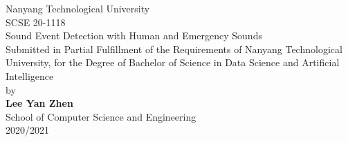 \begin{titlepage}
\centering
\Large{Nanyang Technological University}\\[1.5in]

\centering
\Large{SCSE 20-1118}\\[0.1in]
\Large{Sound Event Detection with Human and Emergency Sounds}\\[1.5in]

\Large{Submitted in Partial Fulfillment of the 
Requirements of Nanyang Technological University, 
for the Degree of Bachelor of Science in Data Science 
and Artificial Intelligence}\\[0.5in]
\Large{by}\\[0.5in]

\Large{\textbf{Lee Yan Zhen}}\\[1in]

\Large{School of Computer Science and Engineering}\\[0.5in]

\Large{2020/2021}\\
\newpage
\end{titlepage}